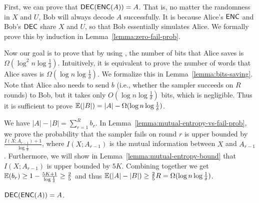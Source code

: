 First, we can prove that $\textsf{DEC}(\textsf{ENC}(A))=A$. That is, no matter the randomness in $X$ and $U$, Bob will always decode $A$ successfully. It is because Alice's $\textsf{ENC}$ and Bob's $\textsf{DEC}$ share $X$ and $U$, so that Bob essentially simulates Alice. We formally prove this by induction in Lemma~\ref{lemma:zero-fail-prob}. 

Now our goal is to prove that by using \samp, the number of bits that Alice saves is $\Omega(\log^2 n \log\frac{1}{\delta})$. Intuitively, it is equivalent to prove the number of words that Alice saves is $\Omega(\log n \log\frac{1}{\delta})$.
We formalize this in Lemma~\ref{lemma:bits-saving}. Note that Alice also needs to send $b$ (i.e., whether the sampler succeeds on $R$ rounds) to Bob, but it takes only $O(\log n \log\frac{1}{\delta})$ bits, which is negligible. Thus it is sufficient to prove $\operatorname*{\mathbb{E}}(|B|)=|A|-\Omega(\log n \log\frac{1}{\delta})$. 

We have $|A|-|B|=\sum_{r=1}^{R}b_r$. 
In Lemma~\ref{lemma:mutual-entropy-vs-fail-prob}, we prove the probability that the sampler fails on round $r$ is upper bounded by $\frac{I(X;A_{r-1})+1}{\log \frac{1}{\delta}}$, where $I(X;A_{r-1})$ is the mutual information between $X$ and $A_{r-1}$. 
Furthermore, we will show in Lemma~\ref{lemma:mutual-entropy-bound} that $I(X;A_{r-1})$ is upper bounded by $5K$.
Combining together we get $\operatorname*{\mathbb{E}}(b_r)\ge 1-\frac{5K+1}{\log \frac{1}{\delta}}\ge \frac{2}{5}$ and thus $\operatorname*{\mathbb{E}}(|A|-|B|)\ge \frac{2}{5}R=\Omega(\log n \log\frac{1}{\delta})$. 

\begin{lemma}\label{lemma:zero-fail-prob}
  $\textsf{DEC}(\textsf{ENC}(A))=A$.
\end{lemma}

